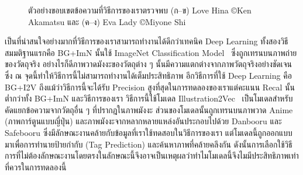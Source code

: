 \begin{figure}[!h]
{    }
    \caption{ตัวอย่างขอบเขตข้อความที่วิธีการของเราตรวจพบ (ก--ข) Love Hina \copyright Ken Akamatsu และ (ค--ง) Eva Lady \copyright Miyone Shi}
    \label{Fig:ExampleResult}
\end{figure}

เป็นที่น่าสนใจอย่างมากที่วิธีการของเราสามารถทำงานได้ดีกว่าเทคนิค Deep Learning ทั้งสองวิธี สมมติฐานแรกคือ BG+ImN นั้นใช้ ImageNet Classification Model~\cite{Krizhevsky} ซึ่งถูกเทรนบนภาพถ่ายของวัตถุจริง อย่างไรก็ดีภาพวาดมังงะของวัตถุต่าง ๆ นั้นมีความแตกต่างจากภาพวัตถุจริงอย่างชัดเจนซึ่ง ณ จุดนี้ทำให้วิธีการนี้ไม่สามารถทำงานได้เต็มประสิทธิภาพ อีกวิธีการที่ใช้ Deep Learning คือ BG+I2V ถึงแม้ว่าวิธีการนี้จะได้รับ Precision สูงที่สุดในการทดลองของเราแต่คะแนน Recal นั้นต่ำกว่าทั้ง BG+ImN และวิธีการของเรา วิธีการนี้ใช้โมเดล Illustration2Vec~\cite{Saito:2015:ISV:2820903.2820907} เป็นโมเดลสำหรับคัดแยกข้อความจากวัตถุอื่น ๆ ที่ปรากฎในภาพมังงะ ส่วนของโมเดลนั้นถูกเทรนบนภาพวาด Anime (ภาพการ์ตูนแบบญี่ปุ่น) และภาพมังงะจากหลากหลายแหล่งอันประกอบไปด้วย Danbooru และ Safebooru ซึ่งมีลักษณะงานคล้ายกับข้อมูลที่เราใช้ทดสอบในวิธีการของเรา แต่โมเดลนี้ถูกออกแบบมาเพื่อการทำนายป้ายกำกับ (Tag Prediction) และค้นหาภาพที่คล้ายคลึงกัน ดังนั้นการเลือกใช้วิธีการที่ไม่ต้องลักษณะงานโดยตรงในลักษณะนี้จึงอาจเป็นเหตุผลว่าทำไมโมเดลนี้จึงไมมีประสิทธิภาพเท่าที่ควรในการทดลองนี้
